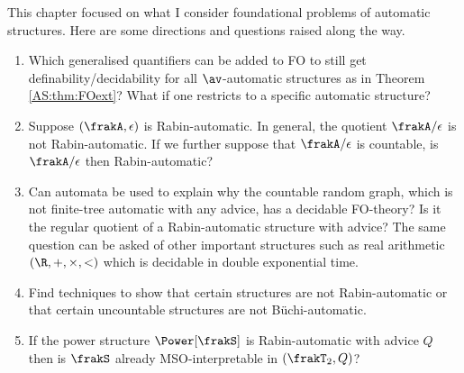 This chapter focused on what I consider foundational problems of automatic structures. 
Here are some directions and questions raised along the way.
\begin{enumerate}
\item Which generalised quantifiers can be added to FO to still get definability/decidability for all $\av$-automatic structures as in Theorem \ref{AS:thm:FOext}? 
What if one restricts to a specific automatic structure? 
\item Suppose $(\frakA,\epsilon)$ is Rabin-automatic. In general, the quotient $\frakA/\epsilon$ is not Rabin-automatic. If we further suppose that $\frakA/\epsilon$ is countable, is $\frakA/\epsilon$ then Rabin-automatic?
\item Can automata be used to explain why the countable random graph, which is not finite-tree automatic with any advice,  has a decidable FO-theory? Is it the regular quotient of a Rabin-automatic structure with advice? The same question can be asked of other important structures such as real arithmetic $(\R,+,\times,<)$ which is decidable in double exponential time. 
\item Find techniques to show that certain structures are not Rabin-automatic or that certain uncountable structures are not B\"uchi-automatic.
\item If the power structure $\Power[\frakS]$ is Rabin-automatic with advice $Q$ then is $\frakS$ already MSO-interpretable in $(\frakT_2,Q)$?
\end{enumerate}



